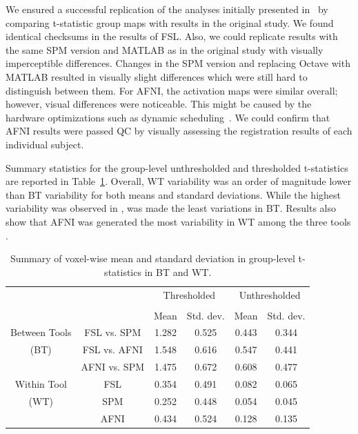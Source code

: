 \documentclass[conference]{IEEEtran}
\begin{document}
We ensured a successful replication of the analyses initially presented in~\cite{bowring2019exploring}
by comparing t-statistic group maps with results in the original study.
We found identical checksums in the results of FSL.
Also, we could replicate results with the same SPM version and MATLAB as in the original study with visually imperceptible differences.
Changes in the SPM version and replacing Octave with MATLAB resulted in visually slight differences which were still hard to distinguish between them.
For AFNI, the activation maps were similar overall; however, visual differences were noticeable.
This might be caused by the hardware optimizations such as dynamic scheduling~\cite{demmel2013numerical}.
We could confirm that AFNI results were passed QC by visually assessing the registration results of each individual subject.

Summary statistics for the group-level unthresholded and thresholded t-statistics are reported in Table~\ref{table:pipeline-stats}.
Overall, WT variability was an order of magnitude lower than BT variability for both means and standard deviations.
While the highest variability was observed in \fslafni, \fslspm was made the least variations in BT.
Results also show that AFNI was generated the most variability in WT among the three tools .


\setlength{\tabcolsep}{5pt}
\begin{table}[h]
    \centering
    \begin{tabular}{cccc|cc}
        \toprule
        \multirow{2}{*}{}& {} & \multicolumn{2}{c}{Thresholded} & \multicolumn{2}{c}{Unthresholded} \\
        \cmidrule{3-4} \cmidrule{5-6} \\
        {} & {} & Mean & Std. dev. & Mean & Std. dev. \\
        \midrule
        \rowcolor{lightgray}
        {Between Tools} & FSL vs. SPM        &  1.282       & 0.525      & 0.443     & 0.344  \\
        \rowcolor{lightgray}
        {(BT)} & FSL vs. AFNI                &  1.548       & 0.616      & 0.547     & 0.441  \\
        \rowcolor{lightgray}
        {} & AFNI vs. SPM                    &  1.475       & 0.672      & 0.608     & 0.477  \\
        {Within Tool} & FSL                  &  0.354       & 0.491      & 0.082     & 0.065  \\
        {(WT)}   & SPM                       &  0.252       & 0.448      & 0.054     & 0.045  \\
        {}   & AFNI                          &  0.434       & 0.524      & 0.128     & 0.135  \\
        \bottomrule
    \end{tabular}
    \caption{Summary of voxel-wise mean and standard deviation in group-level t-statistics in BT and WT.}
    \label{table:pipeline-stats}
\end{table}
\end{document}
